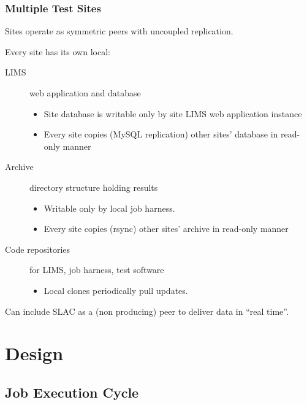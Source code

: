 \documentclass[xcolor=dvipsnames]{beamer}
\begin{document}
\begin{frame}
  \frametitle{Multiple Test Sites}
  \begin{center}
    Sites operate as symmetric peers with uncoupled replication.    
  \end{center}


  Every site has its own local:
  \begin{description}
  \item[LIMS] web application and database
    \begin{itemize}
    \item Site database is writable only by site LIMS web application instance
    \item Every site copies (MySQL replication) other sites' database in read-only manner
    \end{itemize}
  \item[Archive] directory structure holding results
    \begin{itemize}
    \item Writable only by local job harness.
    \item Every site copies (rsync) other sites' archive in read-only manner
    \end{itemize}
  \item[Code repositories] for LIMS, job harness, test software
    \begin{itemize}
    \item Local clones periodically pull updates.
    \end{itemize}
  \end{description}

  Can include SLAC as a (non producing) peer to deliver data in ``real time''.
\end{frame}

\section{Design}

\begin{frame}
\end{frame}



\subsection{Job Execution Cycle}
\end{document}
